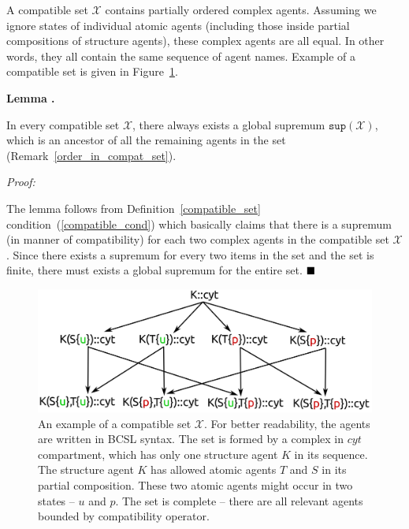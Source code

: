 \documentclass[12pt, twoside]{fithesis2} %
\newcounter{counter}[section]
\renewcommand{\thecounter}{\thesection.\arabic{counter}}
\newenvironment{proof}{\noindent\emph{Proof:~ }\nopagebreak \begin{itshape}}{\end{itshape}\bigskip}
\newenvironment{lemma}{\bigskip\refstepcounter{counter}\noindent\textbf{Lemma \thecounter }\nopagebreak \begin{itshape}}{\end{itshape}\bigskip}
\newcommand*{\QEDA}{\hfill\ensuremath{\blacksquare}}%
\begin{document}
A compatible set $\mathscr{X}$ contains partially ordered complex agents. Assuming we ignore states of individual atomic agents (including those inside partial compositions of structure agents), these complex agents are all equal. In other words, they all contain the same sequence of agent names. Example of a compatible set is given in Figure~\ref{compatible_set_example}.

\begin{lemma}
\label{global_supremum}
In every compatible set $\mathscr{X}$, there always exists a global supremum $\mathtt{sup}(\mathscr{X})$, which is an ancestor of all the remaining agents in the set (Remark~\ref{order_in_compat_set}).
\end{lemma}

\begin{proof}
The lemma follows from Definition~\ref{compatible_set} condition~(\ref{compatible_cond}) which basically claims that there is a supremum (in manner of compatibility) for each two complex agents in the compatible set $\mathscr{X}$. Since there exists a supremum for every two items in the set and the set is finite, there must exists a global supremum for the entire set. $\QEDA$
\end{proof}

\begin{figure}[!h]
\begin{center}
\includegraphics[scale=0.13]{pics/partial_order}
\end{center}
\caption{An example of a compatible set $\mathscr{X}$. For better readability, the agents are written in BCSL syntax. The set is formed by a complex in $cyt$ compartment, which has only one structure agent $K$ in its sequence. The structure agent $K$ has allowed atomic agents $T$ and $S$ in its partial composition. These two atomic agents might occur in two states -- $u$ and $p$. The set is complete -- there are all relevant agents bounded by compatibility operator.}\label{compatible_set_example}
\end{figure}
\end{document}
